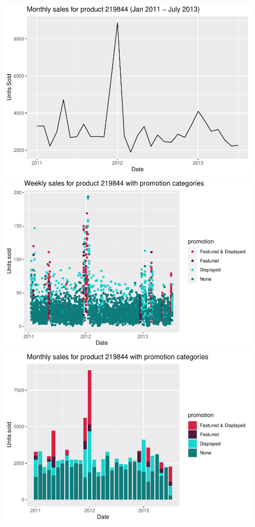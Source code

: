\documentclass[
  11pt,
]{article}
\begin{document}
\includegraphics{Assignment-STAT702_files/figure-latex/1a plots-1.pdf}
\includegraphics{Assignment-STAT702_files/figure-latex/1a plots-2.pdf}
\includegraphics{Assignment-STAT702_files/figure-latex/1a plots-3.pdf}
\end{document}
